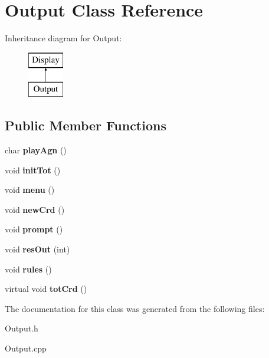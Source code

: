 \hypertarget{class_output}{}\section{Output Class Reference}
\label{class_output}
Inheritance diagram for Output\+:\begin{figure}[H]
\begin{center}
\leavevmode
\includegraphics[height=2.000000cm]{class_output}
\end{center}
\end{figure}
\subsection*{Public Member Functions}
\begin{DoxyCompactItemize}
\item 
\mbox{\label{class_output_ab4e7582b1ad61b1b3b35ef4efbe49fcf}} 
char {\bfseries play\+Agn} ()
\item 
\mbox{\label{class_output_a406a426a523d0ccf643495f5d1673c78}} 
void {\bfseries init\+Tot} ()
\item 
\mbox{\label{class_output_a93053a639b2862882357510dfd3056db}} 
void {\bfseries menu} ()
\item 
\mbox{\label{class_output_a90b44faaeea1f51b050b9b87306d0c93}} 
void {\bfseries new\+Crd} ()
\item 
\mbox{\label{class_output_a42f345cec50dfefceffacbcb67a058da}} 
void {\bfseries prompt} ()
\item 
\mbox{\label{class_output_a5c5a77616fc6b9d3d08b1ff696229014}} 
void {\bfseries res\+Out} (int)
\item 
\mbox{\label{class_output_ad2dbdd7199f17ba9667413a1b74ab2c7}} 
void {\bfseries rules} ()
\item 
\mbox{\label{class_output_af55affe051ce011fe7f277220046c2bf}} 
virtual void {\bfseries tot\+Crd} ()
\end{DoxyCompactItemize}


The documentation for this class was generated from the following files\+:\begin{DoxyCompactItemize}
\item 
Output.\+h\item 
Output.\+cpp\end{DoxyCompactItemize}
